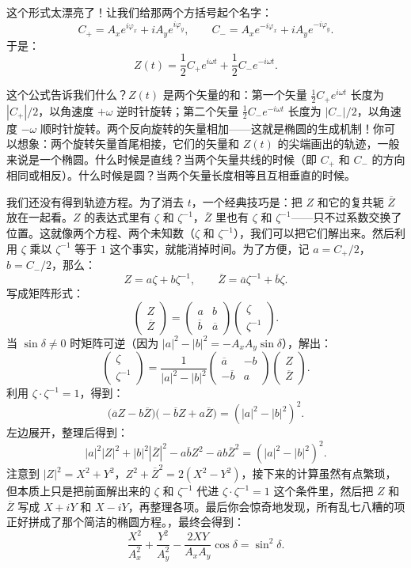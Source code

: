 \documentclass[UTF8]{ctexbook}
\begin{document}
这个形式太漂亮了！让我们给那两个方括号起个名字：
\[
C_+ = A_x e^{i\varphi_x} + i A_y e^{i\varphi_y},\qquad
C_- = A_x e^{-i\varphi_x} + i A_y e^{-i\varphi_y}.
\]
于是：
\[
\boxed{Z(t) = \frac{1}{2} C_+ e^{i\omega t} + \frac{1}{2} C_- e^{-i\omega t}}.
\]

这个公式告诉我们什么？$Z(t)$ 是两个矢量的和：第一个矢量 $\frac{1}{2}C_+ e^{i\omega t}$ 长度为 $|C_+|/2$，以角速度 $+\omega$ 逆时针旋转；第二个矢量 $\frac{1}{2}C_- e^{-i\omega t}$ 长度为 $|C_-|/2$，以角速度 $-\omega$ 顺时针旋转。两个反向旋转的矢量相加——这就是椭圆的生成机制！你可以想象：两个旋转矢量首尾相接，它们的矢量和 $Z(t)$ 的尖端画出的轨迹，一般来说是一个椭圆。什么时候是直线？当两个矢量共线的时候（即 $C_+$ 和 $C_-$ 的方向相同或相反）。什么时候是圆？当两个矢量长度相等且互相垂直的时候。

我们还没有得到轨迹方程。为了消去 $t$，一个经典技巧是：把 $Z$ 和它的复共轭 $\overline{Z}$ 放在一起看。$Z$ 的表达式里有 $\zeta$ 和 $\zeta^{-1}$，$\overline{Z}$ 里也有 $\zeta$ 和 $\zeta^{-1}$——只不过系数交换了位置。这就像两个方程、两个未知数（$\zeta$ 和 $\zeta^{-1}$），我们可以把它们解出来。然后利用 $\zeta$ 乘以 $\zeta^{-1}$ 等于 $1$ 这个事实，就能消掉时间。为了方便，记 $a = C_+/2$，$b = C_-/2$，那么：
\[
Z = a\zeta + b\zeta^{-1},\qquad \overline{Z} = \overline{a}\zeta^{-1} + \overline{b}\zeta.
\]
写成矩阵形式：
\[
\begin{pmatrix} Z \\ \overline{Z} \end{pmatrix}
= \begin{pmatrix} a & b \\ \overline{b} & \overline{a} \end{pmatrix}
\begin{pmatrix} \zeta \\ \zeta^{-1} \end{pmatrix}.
\]
当 $\sin\delta \neq 0$ 时矩阵可逆（因为 $|a|^2-|b|^2 = -A_xA_y\sin\delta$），解出：
\[
\begin{pmatrix} \zeta \\ \zeta^{-1} \end{pmatrix}
= \frac{1}{|a|^2-|b|^2}
\begin{pmatrix} \overline{a} & -b \\ -\overline{b} & a \end{pmatrix}
\begin{pmatrix} Z \\ \overline{Z} \end{pmatrix}.
\]
利用 $\zeta \cdot \zeta^{-1}=1$，得到：
\[
\big(\overline{a}Z - b\overline{Z}\big)\big(-\overline{b}Z + a\overline{Z}\big) = (|a|^2-|b|^2)^2.
\]
左边展开，整理后得到：
\[
|a|^2|Z|^2 + |b|^2|\overline{Z}|^2 - a\overline{b}Z^2 - \overline{a}b\overline{Z}^2 = (|a|^2-|b|^2)^2.
\]
注意到 $|Z|^2 = X^2+Y^2$，$Z^2+\overline{Z}^2 = 2(X^2-Y^2)$，接下来的计算虽然有点繁琐，但本质上只是把前面解出来的 $\zeta$ 和 $\zeta^{-1}$ 代进 $\zeta \cdot \zeta^{-1}=1$ 这个条件里，然后把 $Z$ 和 $\overline{Z}$ 写成 $X+iY$ 和 $X-iY$，再整理各项。最后你会惊奇地发现，所有乱七八糟的项正好拼成了那个简洁的椭圆方程。，最终会得到：
\[
\boxed{\frac{X^2}{A_x^2} + \frac{Y^2}{A_y^2} - \frac{2XY}{A_xA_y}\cos\delta = \sin^2\delta}.
\]
\end{document}
